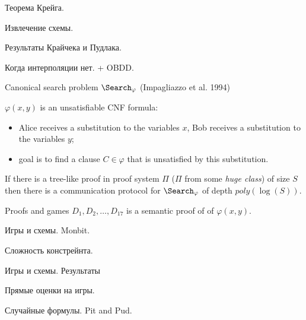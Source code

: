 \begin{frame}
    Теорема Крейга.

    Извлечение схемы.
\end{frame}

\begin{frame}

	Результаты Крайчека и Пудлака.
\end{frame}

\begin{frame}

	Когда интерполяции нет. + OBDD.
\end{frame}


\begin{frame}{Canonical search problem $\Search_{\varphi}$ (Impagliazzo et al. 1994)}

	
    $\varphi(x, y)$ is an unsatisfiable CNF formula:
    \begin{itemize}
        \item Alice receives a substitution to the variables $x$, Bob receives a substitution to the
            variables $y$;
        \item goal is to find a clause $C \in \varphi$ that is unsatisfied by this substitution.
    \end{itemize}

    \pause

    \begin{theorem}
        If there is a {\color{blue} tree-like} proof in proof system $\Pi$ ($\Pi$ from some \textit{huge
          class}) of size $S$ then there is a communication protocol for $\Search_{\varphi}$ of depth
        $poly(\log(S))$.
    \end{theorem}
    
\end{frame}


\begin{frame}{Proofs and games}
	$D_1, D_2, \dots, D_{17}$ is a semantic proof of of $\varphi(x, y)$.

    \begin{center}
    	    
    \end{center}

\end{frame}

\begin{frame}
    Игры и схемы. Monbit.
\end{frame}
    


\begin{frame}

    Сложность констрейнта.

    Игры и схемы. Результаты

    Прямые оценки на игры.
\end{frame}


\begin{frame}

	Случайные формулы.  Pit and Pud.
\end{frame}